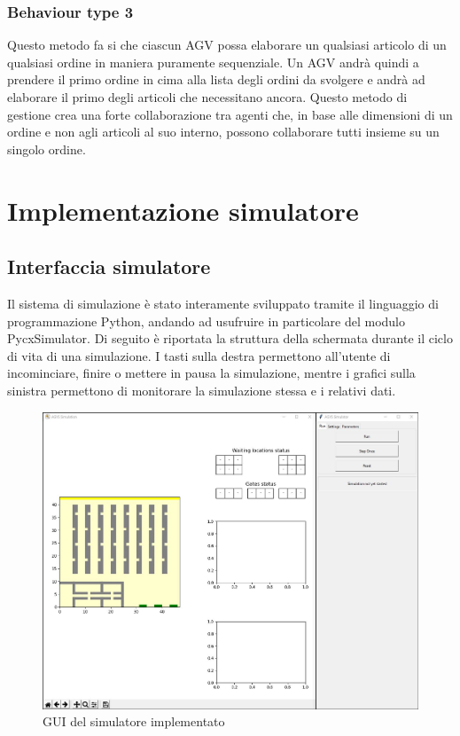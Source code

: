 \documentclass[12pt]{article}
\begin{document}
\subsubsection{Behaviour type 3}
Questo metodo fa si che ciascun AGV possa elaborare un qualsiasi articolo di un qualsiasi ordine in maniera puramente sequenziale. Un AGV andrà quindi a prendere il primo ordine in cima alla lista degli ordini da svolgere e andrà ad elaborare il primo degli articoli che necessitano ancora. Questo metodo di gestione crea una forte collaborazione tra agenti che, in base alle dimensioni di un ordine e non agli articoli al suo interno, possono collaborare tutti insieme su un singolo ordine.
\newpage
\section{Implementazione simulatore} 
\subsection{Interfaccia simulatore}
Il sistema di simulazione è stato interamente sviluppato tramite il linguaggio di programmazione Python, andando ad usufruire in particolare del modulo PycxSimulator.
Di seguito è riportata la struttura della schermata durante il ciclo di vita di una simulazione. I tasti sulla destra permettono all'utente di incominciare, finire o mettere in pausa la simulazione, mentre i grafici sulla sinistra permettono di monitorare la simulazione stessa e i relativi dati.
\begin{figure}[h]
\centering
\includegraphics[width=1\textwidth,height=\textheight,keepaspectratio]{Figures/GUI/Simulatore.jpg}
\caption[GUI del simulatore implementato]{GUI del simulatore implementato}
\label{fig:Simulatore}
\end{figure}
\end{document}
